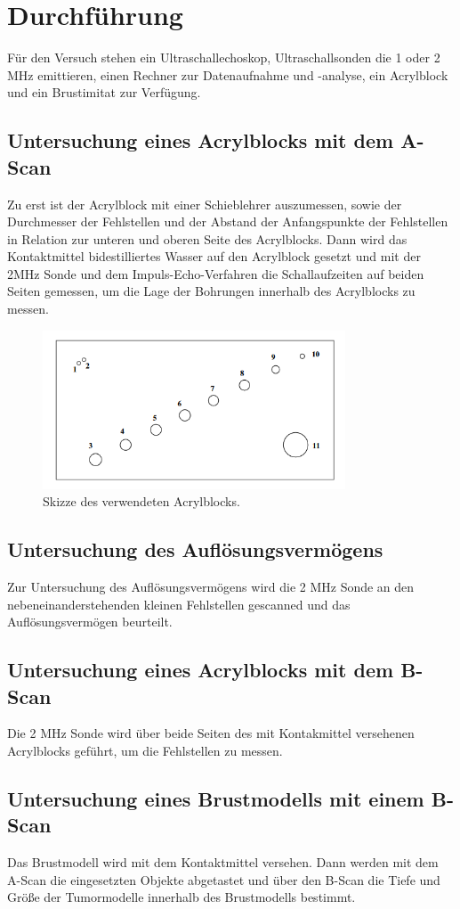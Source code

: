 \section{Durchführung}
\label{sec:Durchführung}
Für den Versuch stehen ein Ultraschallechoskop, Ultraschallsonden die 1 oder 2 MHz emittieren, einen Rechner zur Datenaufnahme und -analyse, ein Acrylblock und ein Brustimitat zur Verfügung.

\subsection{Untersuchung eines Acrylblocks mit dem A-Scan}
Zu erst ist der Acrylblock mit einer Schieblehrer auszumessen, sowie der Durchmesser der Fehlstellen und der Abstand der Anfangspunkte der Fehlstellen in Relation zur unteren und oberen Seite des Acrylblocks.
Dann wird das Kontaktmittel bidestilliertes Wasser auf den Acrylblock gesetzt und mit der 2MHz Sonde und dem Impuls-Echo-Verfahren die Schallaufzeiten auf beiden Seiten gemessen, um die Lage der Bohrungen innerhalb des Acrylblocks zu messen.  
\begin{figure}[H]
  \centering
  \includegraphics[width=9cm]{content/block}
  \caption{Skizze des verwendeten Acrylblocks. \cite{1}}
\end{figure}

\subsection{Untersuchung des Auflösungsvermögens}
Zur Untersuchung des Auflösungsvermögens wird die 2 MHz Sonde an den nebeneinanderstehenden kleinen Fehlstellen gescanned und das Auflösungsvermögen beurteilt.

\subsection{Untersuchung eines Acrylblocks mit dem B-Scan}
Die 2 MHz Sonde wird über beide Seiten des mit Kontakmittel versehenen Acrylblocks geführt, um die Fehlstellen zu messen. 

\subsection{Untersuchung eines Brustmodells mit einem B-Scan}
Das Brustmodell wird mit dem Kontaktmittel versehen. Dann werden mit dem A-Scan die eingesetzten Objekte abgetastet und über den B-Scan die Tiefe und Größe der Tumormodelle innerhalb des Brustmodells bestimmt.
